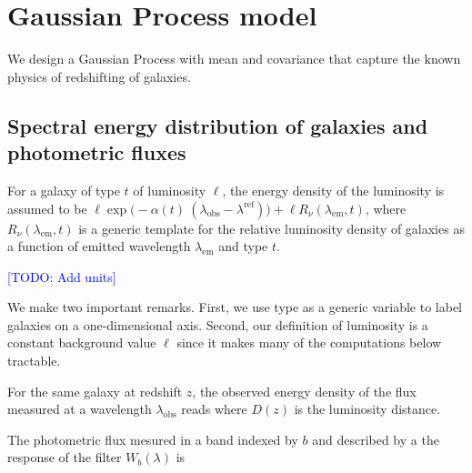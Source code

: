 \documentclass[aps,prd,showpacs,superscriptaddress,groupedaddress]{revtex4}  %
\newcommand{\todo}[1]{\textcolor{blue}{[TODO: #1]}}
\begin{document}
\section{Gaussian Process model}

We design a Gaussian Process with mean and covariance that capture the known physics of redshifting of galaxies.

\subsection{Spectral energy distribution of galaxies and photometric fluxes}

For a galaxy of type $t$ of luminosity $\ell$, the energy density of the luminosity is assumed to be $\ell \exp\bigl(-\alpha(t)\ (\lambda_\mathrm{obs}-\lambda^\mathrm{ref})\bigr)  + \ell R_\nu(\lambda_\mathrm{em},t)$, where $R_\nu(\lambda_\mathrm{em},t)$ is a generic template for the relative luminosity density of galaxies as a function of emitted wavelength $\lambda_\mathrm{em}$ and type $t$.

\todo{Add units}

We make two important remarks.
First, we use type as a generic variable to label galaxies on a one-dimensional axis. 
Second, our definition of luminosity is a constant background value $\ell$ since it makes many of the computations below tractable.

For the same galaxy at redshift $z$, the observed energy density of the flux measured at a wavelength $\lambda_\mathrm{obs}$ reads
where $D(z)$ is the luminosity distance.

The photometric flux mesured in a band indexed by $b$ and described by a the response of the filter $W_b(\lambda)$ is
\end{document}
